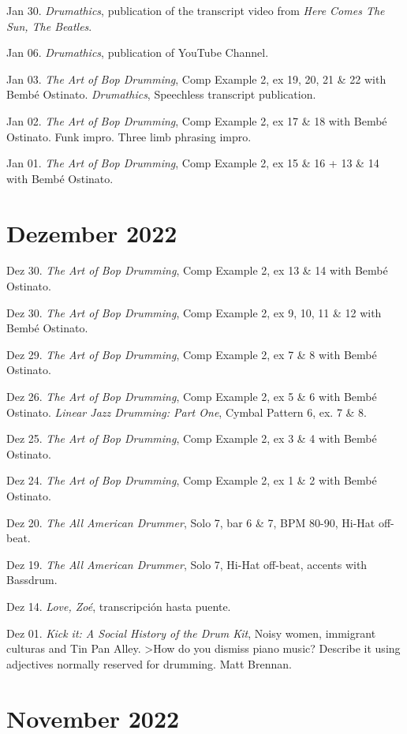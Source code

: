 \documentclass[
]{book}
\begin{document}
Jan 30. \emph{Drumathics}, publication of the transcript video from \emph{Here Comes The Sun, The Beatles}.

Jan 06. \emph{Drumathics}, publication of YouTube Channel.

Jan 03. \emph{The Art of Bop Drumming}, Comp Example 2, ex 19, 20, 21 \& 22 with Bembé Ostinato. \emph{Drumathics}, Speechless transcript publication.

Jan 02. \emph{The Art of Bop Drumming}, Comp Example 2, ex 17 \& 18 with Bembé Ostinato. Funk impro. Three limb phrasing impro.

Jan 01. \emph{The Art of Bop Drumming}, Comp Example 2, ex 15 \& 16 + 13 \& 14 with Bembé Ostinato.

\hypertarget{dezember-2022}{%
\section*{Dezember 2022}\label{dezember-2022}}

Dez 30. \emph{The Art of Bop Drumming}, Comp Example 2, ex 13 \& 14 with Bembé Ostinato.

Dez 30. \emph{The Art of Bop Drumming}, Comp Example 2, ex 9, 10, 11 \& 12 with Bembé Ostinato.

Dez 29. \emph{The Art of Bop Drumming}, Comp Example 2, ex 7 \& 8 with Bembé Ostinato.

Dez 26. \emph{The Art of Bop Drumming}, Comp Example 2, ex 5 \& 6 with Bembé Ostinato. \emph{Linear Jazz Drumming: Part One}, Cymbal Pattern 6, ex. 7 \& 8.

Dez 25. \emph{The Art of Bop Drumming}, Comp Example 2, ex 3 \& 4 with Bembé Ostinato.

Dez 24. \emph{The Art of Bop Drumming}, Comp Example 2, ex 1 \& 2 with Bembé Ostinato.

Dez 20. \emph{The All American Drummer}, Solo 7, bar 6 \& 7, BPM 80-90, Hi-Hat off-beat.

Dez 19. \emph{The All American Drummer}, Solo 7, Hi-Hat off-beat, accents with Bassdrum.

Dez 14. \emph{Love, Zoé}, transcripción hasta puente.

Dez 01. \emph{Kick it: A Social History of the Drum Kit}, Noisy women, immigrant culturas and Tin Pan Alley.
\textgreater How do you dismiss piano music? Describe it using adjectives normally reserved for drumming. Matt Brennan.

\hypertarget{november-2022}{%
\section*{November 2022}\label{november-2022}}
\end{document}
